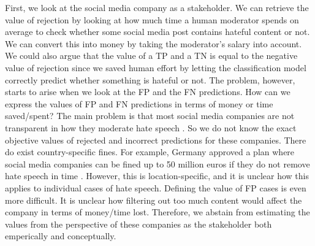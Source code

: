 First, we look at the social media company as a stakeholder.
%
We can retrieve the value of rejection by looking at how much time a human moderator spends on average to check whether some social media post contains hateful content or not.
%
We can convert this into money by taking the moderator's salary into account.
%
We could also argue that the value of a TP and a TN is equal to the negative value of rejection since we saved human effort by letting the classification model correctly predict whether something is hateful or not.
%
The problem, however, starts to arise when we look at the FP and the FN predictions.
%
How can we express the values of FP and FN predictions in terms of money or time saved/spent?
%
The main problem is that most social media companies are not transparent in how they moderate hate speech \citep{klonick2017new}.
%
So we do not know the exact objective values of rejected and incorrect predictions for these companies. 
%
There do exist country-specific fines.
%
For example, Germany approved a plan where social media companies can be fined up to 50 million euros if they do not remove hate speech in time \citep{bbc-firms-face-fine-germany}.
%
However, this is location-specific, and it is unclear how this applies to individual cases of hate speech.
%
Defining the value of FP cases is even more difficult.
%
It is unclear how filtering out too much content would affect the company in terms of money/time lost.
%
Therefore, we abstain from estimating the values from the perspective of these companies as the stakeholder both emperically and conceptually.

